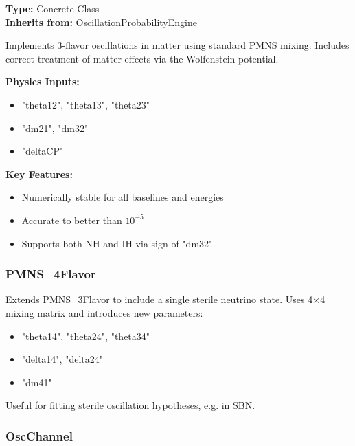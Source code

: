 \textbf{Type:} Concrete Class \\
\textbf{Inherits from:} {\color{cadmiumgreen} OscillationProbabilityEngine}

Implements 3-flavor oscillations in matter using standard PMNS mixing.  
Includes correct treatment of matter effects via the Wolfenstein potential.

\vspace{0.5em}
\noindent\textbf{Physics Inputs:}
\begin{itemize}
  \item {\color{amber}"theta12"}, {\color{amber}"theta13"}, {\color{amber}"theta23"}
  \item {\color{amber}"dm21"}, {\color{amber}"dm32"}
  \item {\color{amber}"deltaCP"}
\end{itemize}

\vspace{0.5em}
\noindent\textbf{Key Features:}
\begin{itemize}
  \item Numerically stable for all baselines and energies
  \item Accurate to better than $10^{-5}$
  \item Supports both NH and IH via sign of {\color{amber}"dm32"}
\end{itemize}

\vspace{1em}
\subsubsection*{\color{cadmiumgreen}\bf PMNS\_4Flavor}

Extends {\color{cadmiumgreen} PMNS\_3Flavor} to include a single sterile neutrino state.  
Uses 4$\times$4 mixing matrix and introduces new parameters:

\begin{itemize}
  \item {\color{amber}"theta14"}, {\color{amber}"theta24"}, {\color{amber}"theta34"}
  \item {\color{amber}"delta14"}, {\color{amber}"delta24"}
  \item {\color{amber}"dm41"}
\end{itemize}

Useful for fitting sterile oscillation hypotheses, e.g. in SBN.

\vspace{1em}
\subsubsection*{\color{cadmiumgreen}\bf OscChannel}


